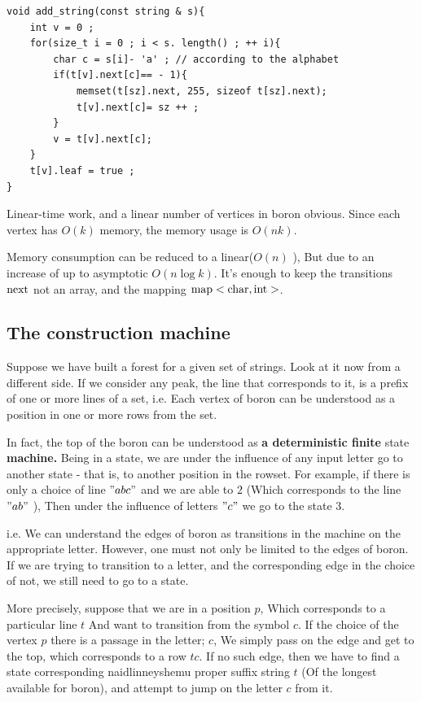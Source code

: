 \begin{verbatim}
void add_string(const string & s){
    int v = 0 ;
    for(size_t i = 0 ; i < s. length() ; ++ i){
        char c = s[i]- 'a' ; // according to the alphabet
        if(t[v].next[c]== - 1){
            memset(t[sz].next, 255, sizeof t[sz].next);
            t[v].next[c]= sz ++ ;
        }
        v = t[v].next[c];
    }
    t[v].leaf = true ;
} 
\end{verbatim}
Linear-time work, and a linear number of vertices in boron obvious. Since each vertex has $O (k)$ memory, the memory usage is $O (n k)$.

Memory consumption can be reduced to a linear($O (n)$ ), But due to an increase of up to asymptotic $O (n \log k)$. It's enough to keep the transitions $\rm next$ not an array, and the mapping $\rm map <char,int>$.

\subsection{ The construction machine }

Suppose we have built a forest for a given set of strings. Look at it now from a different side. If we consider any peak, the line that corresponds to it, is a prefix of one or more lines of a set, i.e. Each vertex of boron can be understood as a position in one or more rows from the set.

In fact, the top of the boron can be understood as \textbf{a deterministic finite} state \textbf{machine.} Being in a state, we are under the influence of any input letter go to another state - that is, to another position in the rowset. For example, if there is only a choice of line $" abc"$ and we are able to $2$ (Which corresponds to the line $" ab"$ ), Then under the influence of letters $" c"$ we go to the state $3$.

i.e. We can understand the edges of boron as transitions in the machine on the appropriate letter. However, one must not only be limited to the edges of boron. If we are trying to transition to a letter, and the corresponding edge in the choice of not, we still need to go to a state.

More precisely, suppose that we are in a position $p$, Which corresponds to a particular line $t$ And want to transition from the symbol $c$. If the choice of the vertex $p$ there is a passage in the letter; $c$, We simply pass on the edge and get to the top, which corresponds to a row $tc$. If no such edge, then we have to find a state corresponding naidlinneyshemu proper suffix string $t$ (Of the longest available for boron), and attempt to jump on the letter $c$ from it.

